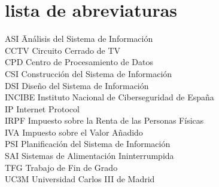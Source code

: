 \newpage %
\thispagestyle{empty}
\mbox{}

\chapter*{lista de abreviaturas}
\begin{tabbing}  %
	ASI \quad\quad\quad\= Análisis del Sistema de Información \\
	CCTV \> Circuito Cerrado de TV \\
	CPD \>  Centro de Procesamiento de Datos \\
	CSI \> Construcción del Sistema de Información \\
	DSI \> Diseño del Sistema de Información \\
	INCIBE \> Instituto Nacional de Ciberseguridad de España \\
	IP \> Internet Protocol \\
	IRPF  \>   Impuesto sobre la Renta de las Personas Físicas \\
	IVA \>  Impuesto sobre el Valor Añadido \\
	PSI \> Planificación del Sistema de Información \\
	SAI \> Sistemas de Alimentación Ininterrumpida \\
	TFG \>  Trabajo de Fin de Grado \\
	UC3M  \>  Universidad Carlos III de Madrid
\end{tabbing}